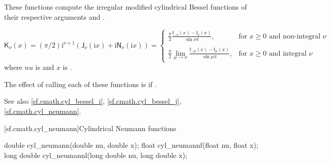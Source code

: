 \begin{itemdescr}

\pnum\effects
These functions compute
the irregular modified cylindrical Bessel functions
of their respective arguments
 and .

\pnum\returns
\[%
  \mathsf{K}_\nu(x) =
  (\pi/2)\mathrm{i}^{\nu+1} (            \mathsf{J}_\nu(\mathrm{i}x)
			    + \mathrm{i} \mathsf{N}_\nu(\mathrm{i}x)
			    )
  =
  \left\{
  \begin{array}{cl}
  \displaystyle
  \frac{\pi}{2}
  \frac{\mathsf{I}_{-\nu}(x) - \mathsf{I}_{\nu}(x)}
       {\sin \nu\pi },
  & \mbox{for $x \ge 0$ and non-integral $\nu$}
  \\
  \\
  \displaystyle
  \frac{\pi}{2}
  \lim_{\mu \rightarrow \nu} \frac{\mathsf{I}_{-\mu}(x) - \mathsf{I}_{\mu}(x)}
                                  {\sin \mu\pi },
  & \mbox{for $x \ge 0$ and integral $\nu$}
  \end{array}
  \right.
\]
where
$nu$ is  and
$x$ is .

\pnum\remarks
The effect of calling each of these functions
is 
if .

\pnum See also \ref{sf.cmath.cyl_bessel_i}, \ref{sf.cmath.cyl_bessel_j}, \ref{sf.cmath.cyl_neumann}.
\end{itemdescr}

[sf.cmath.cyl_neumann]{Cylindrical Neumann functions}%
%
%
%
%
%
%
\begin{itemdecl}
double       cyl_neumann(double nu, double x);
float        cyl_neumannf(float nu, float x);
long double  cyl_neumannl(long double nu, long double x);
\end{itemdecl}

